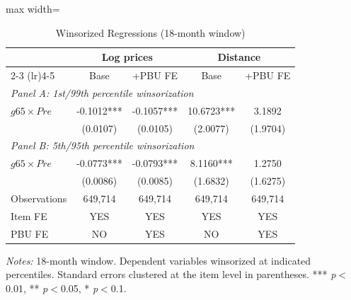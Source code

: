 \begin{table}[htbp]
\centering
\caption{Winsorized Regressions (18-month window)}
\label{tab:winsorize}
\begin{adjustbox}{max width=\textwidth}
\begin{threeparttable}
\small
\begin{tabular}{lcccc}
\toprule
 & \multicolumn{2}{c}{Log prices} & \multicolumn{2}{c}{Distance} \\
\cmidrule(lr){2-3} \cmidrule(lr){4-5}
 & Base & +PBU FE & Base & +PBU FE \\
\midrule
\multicolumn{5}{l}{\textit{Panel A: 1st/99th percentile winsorization}} \\
$g65 \times Pre$ & -0.1012*** & -0.1057*** & 10.6723*** & 3.1892 \\
 & (0.0107) & (0.0105) & (2.0077) & (1.9704) \\
\midrule
\multicolumn{5}{l}{\textit{Panel B: 5th/95th percentile winsorization}} \\
$g65 \times Pre$ & -0.0773*** & -0.0793*** & 8.1160*** & 1.2750 \\
 & (0.0086) & (0.0085) & (1.6832) & (1.6275) \\
\midrule
Observations & 649,714 & 649,714 & 649,714 & 649,714 \\
Item FE & YES & YES & YES & YES \\
PBU FE & NO & YES & NO & YES \\
\bottomrule
\end{tabular}
\begin{tablenotes}
\small
\item \textit{Notes:} 18-month window. Dependent variables winsorized at indicated percentiles.
Standard errors clustered at the item level in parentheses.
*** \textit{p}$<$0.01, ** \textit{p}$<$0.05, * \textit{p}$<$0.1.
\end{tablenotes}
\end{threeparttable}
\end{adjustbox}
\end{table}
